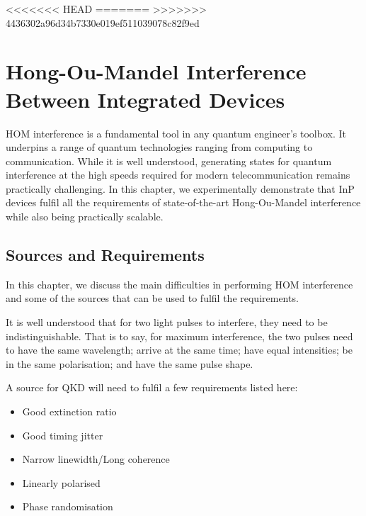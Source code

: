%
%
<<<<<<< HEAD
\glsresetall
=======
\acresetall
>>>>>>> 4436302a96d34b7330e019ef511039078c82f9ed
\graphicspath{{./chapters/chapter03/fig03/}}

\let\textcircled=\pgftextcircled
\chapter{Hong-Ou-Mandel Interference Between Integrated Devices}
\label{chap:hom}

\ac{HOM} interference is a fundamental tool in any quantum engineer's toolbox. It underpins a range of quantum technologies ranging from computing to communication. While it is well understood, generating states for quantum interference at the high speeds required for modern telecommunication remains practically challenging. In this chapter, we experimentally demonstrate that \ac{InP} devices fulfil all the requirements of state-of-the-art Hong-Ou-Mandel interference while also being practically scalable. 

\section{Sources and Requirements}
\label{sec:sources}

In this chapter, we discuss the main difficulties in performing	\ac{HOM} interference and some of the sources that can be used to fulfil the requirements. 

It is well understood that for two light pulses to interfere, they need to be indistinguishable. That is to say, for maximum interference, the two pulses need to have the same wavelength; arrive at the same time; have equal intensities; be in the same polarisation; and have the same pulse shape.

A source for \ac{QKD} will need to fulfil a few requirements listed here:

\begin{itemize}
	\item Good extinction ratio
	\item Good timing jitter
	\item Narrow linewidth/Long coherence
	\item Linearly polarised
	\item Phase randomisation
\end{itemize}

